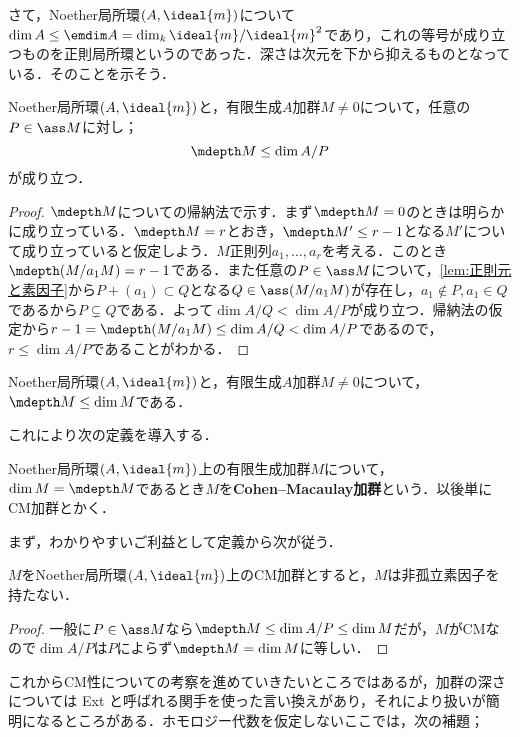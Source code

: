 さて，Noether局所環$(A,\ideal{m})$について$\dim A\leq \emdim A=\dim_k\ideal{m}/\ideal{m}^2$であり，これの等号が成り立つものを正則局所環というのであった．深さは次元を下から抑えるものとなっている．そのことを示そう．

\begin{prop}
	Noether局所環$(A,\ideal{m})$と，有限生成$A$加群$M\neq0$について，任意の$P\in\ass M$に対し；
	\[\mdepth M\leq\dim A/P\]
	が成り立つ．
\end{prop}

\begin{proof}
	$\mdepth M$についての帰納法で示す．まず$\mdepth M=0$のときは明らかに成り立っている．$\mdepth M=r$とおき，$\mdepth M'\leq r-1$となる$M'$について成り立っていると仮定しよう．$M$正則列$a_1,\dots,a_r$を考える．このとき$\mdepth (M/a_1M)=r-1$である．また任意の$P\in\ass M$について，\ref{lem:正則元と素因子}から$P+(a_1)\subset Q$となる$Q\in\ass (M/a_1M)$が存在し，$a_1\not\in P,a_1\in Q$であるから$P\subsetneq Q$である．よって$\dim A/Q<\dim A/P$が成り立つ．帰納法の仮定から$r-1=\mdepth (M/a_1M)\leq\dim A/Q<\dim A/P$であるので，$r\leq\dim A/P$であることがわかる． 
\end{proof}

\begin{cor}
	Noether局所環$(A,\ideal{m})$と，有限生成$A$加群$M\neq0$について，$\mdepth M\leq\dim M$である．
\end{cor}

これにより次の定義を導入する．

\begin{defi}
	Noether局所環$(A,\ideal{m})$上の有限生成加群$M$について，$\dim M=\mdepth M$であるとき$M$を\textbf{Cohen--Macaulay加群}という．以後単にCM加群とかく．
\end{defi}

まず，わかりやすいご利益として定義から次が従う．

\begin{prop}\label{prop:CM加群は非孤立素因子を持たない}
	$M$をNoether局所環$(A,\ideal{m})$上のCM加群とすると，$M$は非孤立素因子を持たない．
\end{prop}

\begin{proof}
	一般に$P\in\ass M$なら$\mdepth M\leq\dim A/P\leq\dim M$だが，$M$がCMなので$\dim A/P$は$P$によらず$\mdepth M=\dim M$に等しい．
\end{proof}
これからCM性についての考察を進めていきたいところではあるが，加群の深さについては Ext と呼ばれる関手を使った言い換えがあり，それにより扱いが簡明になるところがある．ホモロジー代数を仮定しないここでは，次の補題；

